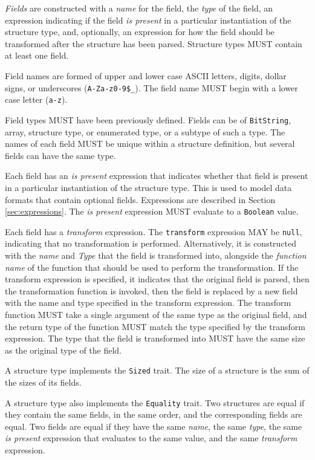 \documentclass[10pt,twocolumn,a4paper]{article}
\newcommand{\code}[1]{\texttt{#1}}
\begin{document}
\emph{Fields} are constructed with a \emph{name} for the field, the
\emph{type} of the field, an expression indicating if the field
\emph{is present} in a particular instantiation of the structure type,
and, optionally, an expression for how the field
should be transformed after the structure has been parsed. Structure types
MUST contain at least one field.

Field names are formed of upper and lower case ASCII letters,
digits, dollar signs, or underscores (\code{A-Za-z0-9\$\_}). The field name
MUST begin with a lower case letter (\code{a-z}).

Field types MUST have been previously defined.
Fields can be of \code{BitString}, array, structure type, or enumerated type,
or a subtype of such a type. The names of each field MUST be unique
within a structure definition, but several fields can have the same type.

Each field has an \emph{is present} expression that indicates
whether that field is present in a particular instantiation of the
structure type. This is used to model data formats that contain optional
fields. Expressions are described in Section \ref{sec:expressions}. The
\emph{is present} expression MUST evaluate to a \code{Boolean} value.

Each field has a \emph{transform} expression.
The \code{transform} expression MAY be \code{null}, indicating that no
transformation is performed. Alternatively, it is constructed with 
the \emph{name} and \emph{Type} that the field is transformed into,
alongside the \emph{function name} of the function that should be
used to perform the transformation.
If the transform expression is specified, it indicates that the original
field is parsed, then the transformation function is invoked, then the field
is replaced by a new field with the name and type specified in the transform
expression.
The transform function MUST take a single argument of the same type as
the original field, and the return type of the function MUST
match the type specified by the transform expression.
The type that the field is transformed into MUST have the same size as the original
type of the field.

A structure type implements the \code{Sized} trait. The size of a structure is the
sum of the sizes of its fields.

A structure type also implements the \code{Equality} trait. Two structures
are equal if they contain the same fields, in the same order, and the
corresponding fields are equal. Two fields are equal if they have the same
\emph{name}, the same \emph{type}, the same \emph{is present} expression
that evaluates to the same value, and the same \emph{transform} expression.
\end{document}
